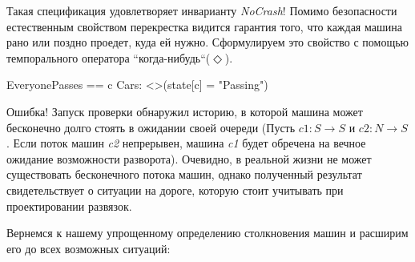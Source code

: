 \documentclass[14pt, openany]{book}
\begin{document}
Такая спецификация удовлетворяет инварианту \emph{NoCrash}! Помимо безопасности естественным свойством перекрестка видится гарантия того, что каждая машина рано или поздно проедет, куда ей нужно. Сформулируем это свойство с помощью темпорального оператора ``когда-нибудь``(\(\Diamond\)).

\begin{tla}
EveryonePasses ==
  \A c \in Cars: <>(state[c] = "Passing")
\end{tla}
\begin{tlatex}
%
\end{tlatex}

Ошибка! Запуск проверки обнаружил историю, в которой машина может бесконечно долго стоять в ожидании своей очереди (Пусть \(c1: S \rightarrow S\) и \(c2: N \rightarrow S\). Если поток машин \emph{c2} непрерывен, машина \emph{c1} будет обречена на вечное ожидание возможности разворота). Очевидно, в реальной жизни не может существовать бесконечного потока машин, однако полученный результат свидетельствует о ситуации на дороге, которую стоит учитывать при проектировании развязок.
 
Вернемся к нашему упрощенному определению столкновения машин и расширим его до всех возможных ситуаций:
\end{document}
